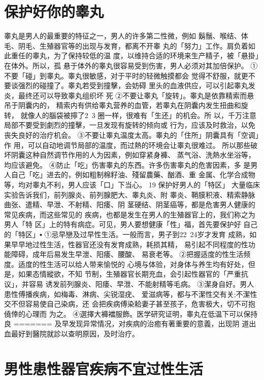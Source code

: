 \documentclass[12pt,UTF8]{ctexbook}
\begin{document}
\section{保护好你的睾丸}
睾丸是男人的最重要的特征之一，男人的许多第二性微，例如
鬍鬚、喉结、体毛、阴毛、生殖器官等的出现与发育，都离不开睾
丸的「努力」工作。肩负着如此重任的睾丸，为了保持较低的温
度，以维持合适的环境来生产精子，被「悬掛」在体外。所以，孤
悬于体外的睾丸很容易受到伤害，男人必须对其加倍保护。
①不要「碰」到睾丸。睾丸很敏感，对于平时的轻微触摸都会
觉得不舒服，就更不要谈强烈的碰撞了。睾丸若受到撞擊，会妨碍
里头的血液供应，可以引起睾丸发炎，最终还可以导致睾丸组织坏
死
②不要让睾丸「旋转」。睾丸是依靠精索而悬吊于阴囊内的，
精索内有供给睾丸营养的血管，若睾丸在阴囊内发生扭曲和旋转，
就像人的腦袋被擰了2~3 圈一样，很难有「生还」的机会。所
以，千万注意局部不要受到劇烈的撞擊，一旦发现有旋转的倾向或
行为，应该及时救治，以免丧失良好的治疗机会。
③不要让睾丸温度太高。睾丸的「住所」阴囊具有「空调」作
用，可以自动地调节局部的温度，而过熱的环境会让睾丸很难过。
所以那些破坏阴囊这种自然调节作用的人为因素，例如穿紧身褲、
蒸气浴、洗熱水坐浴等，均应该避免。
④防止「吃」伤害睾丸的东西。许多伤害睾丸的危害因素，多
是男人自己「吃」进去的，例如粗制棉籽油、殘留農藥、酗酒、重
金属、化学合成物等，均对睾丸不利，男人应该「口」下当心。
19 保护好男人的「特区」
大量临床实验告诉我们，前列腺炎、前列腺肥大、睾丸炎、附
睾炎、鞘膜积液、精索静脉曲张、遣精、早泄、不射精、阳痿、阴
茎硬结、阴茎癌等，都是危害男人健康的常见疾病，而这些常见的
疾病，也都是发生在男人的生殖器官上的，我们称之为男人「特
区」上的特有病症。可见，男人要想健康「性」福，首先要保护好
自己的「特区」▪
①忌早戀及过早性生活。一般而言，男子到22~24岁才发育
成熟，如果早早地过性生活，性器官还没有发育成熟，耗损其精，
易引起不同程度的性功能障碍，成年后易发生早泄、阳痿、腰酸、
易衰老等。
②把握适度的性生活频度。适度的性生活可以给人带来愉悦的
心境与体验，对身体与养生均有好处，但是，如果态情縱欲，不知
节制，生殖器官长期充血，会引起性器官的「严重抗议」，并容易
诱发前列腺炎、阳痿、早泄、不能射精等毛病。
③潔身自好。男人患性傅播疾病，如梅毒、淋病、尖锐湿疣、
爱滋病等，都与不潔性交有关;不潔性交不但容易使自己染病，还
会把疾病傅染耠妻子甚至孩子，危害极大，切不可抱僥倖的心理而
为之。
④選擇大褲襠服飾。医学研究证明，睾丸在低温下可以保持良
=======
及早发现异常情况，对疾病的治癒有著重要的意義，出现阴
道出血最好到醫院就診以查明原因，及时治疗。

\section{男性患性器官疾病不宜过性生活}
\end{document}
